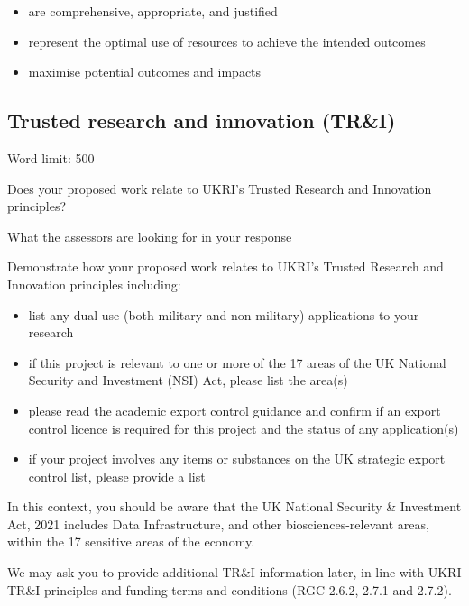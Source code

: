 \documentclass[11pt]{article}
\newenvironment{instruction}{%
    \begin{tcolorbox}[breakable,colback=red!5,colframe=red,title=Instruction]%
	}{%
    	\end{tcolorbox}%
	}
\begin{document}
\begin{instruction}
\begin{itemize}

	\item are comprehensive, appropriate, and justified

	\item represent the optimal use of resources to achieve the intended
outcomes

	\item maximise potential outcomes and impacts

\end{itemize}

\end{instruction}

% 

\pagebreak
\subsection{Trusted research and innovation (TR\&I)}

\begin{instruction}

Word limit: 500

Does your proposed work relate to UKRI’s Trusted Research and Innovation
principles?

What the assessors are looking for in your response

Demonstrate how your proposed work relates to UKRI’s Trusted Research and
Innovation principles including:

\begin{itemize}

	\item list any dual-use (both military and non-military) applications to your research

	\item if this project is relevant to one or more of the 17 areas of the UK National
Security and Investment (NSI) Act, please list the area(s)

	\item please read the academic export control guidance and confirm if an export
control licence is required for this project and the status of any application(s)

	\item if your project involves any items or substances on the UK strategic export
control list, please provide a list

\end{itemize}

In this context, you should be aware that the UK National Security \& Investment
Act, 2021 includes Data Infrastructure, and other biosciences-relevant areas,
within the 17 sensitive areas of the economy.

We may ask you to provide additional TR\&I information later, in line with UKRI
TR\&I principles and funding terms and conditions (RGC 2.6.2, 2.7.1 and 2.7.2).

\end{instruction}
\end{document}
